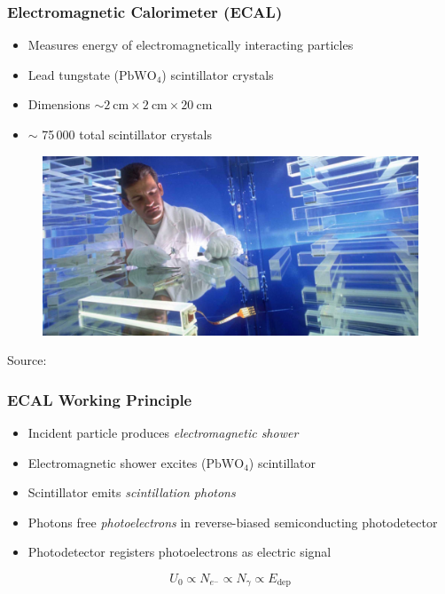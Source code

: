 \documentclass[14pt, t]{beamer}
\newcommand{\chem}[1]{\ensuremath{\mathrm{#1}}}
\begin{document}
\begin{frame}
    \frametitle{Electromagnetic Calorimeter (ECAL)}
    \begin{itemize}
    
        \item Measures energy of electromagnetically interacting particles

        \item Lead tungstate (\chem{PbWO_4}) scintillator crystals
        \item Dimensions $ \sim \SI{2}{\centi \meter} \times \SI{2}{\centi \meter} \times \SI{20}{\centi \meter} $

        \item $ \sim $ 75\,000 total scintillator crystals
    
    \end{itemize}
    \vspace{-3mm}
    \begin{figure}
        \centering
        \includegraphics[width=0.75\linewidth]{raster/png-presentation/ecal-scintillators.jpg}
    \end{figure}
    \vspace{-7mm}
    \hfill
    \tiny{Source: \cite{image-pbwo4}}
    
\end{frame}

\begin{frame}
    \frametitle{ECAL Working Principle}
    \begin{itemize}
    
        \item Incident particle produces \textit{electromagnetic shower}

        \item Electromagnetic shower excites (\chem{PbWO_4}) scintillator 

        \item Scintillator emits \textit{scintillation photons}

        \item Photons free \textit{photoelectrons} in reverse-biased semiconducting photodetector

        \item Photodetector registers photoelectrons as electric signal
    
    \end{itemize}
    \begin{equation*}
        U_{0} \propto N_{e^{-}}  \propto N_{\gamma} \propto E_{\text{dep}}
    \end{equation*}
    
\end{frame}
\end{document}
